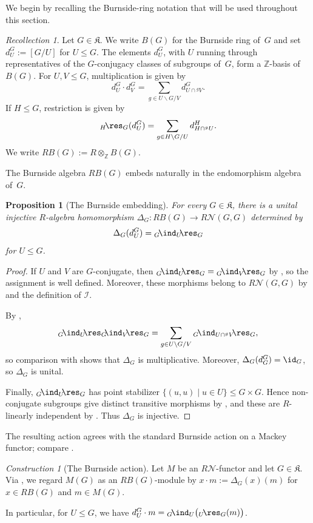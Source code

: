 \documentclass{amsart}
\numberwithin{equation}{section}%
\newtheorem{Prop}[equation]{Proposition}
\theoremstyle{remark}
\newtheorem{Cons}[equation]{Construction}
\newtheorem{Rec}[equation]{Recollection}
\theoremstyle{definition}
\newcommand{\n}{\mathcal N}
\newcommand{\lind}[1]{{}_{#1}\!\ind}
\newcommand{\lres}[1]{{}_{#1}\!\res}
\newcommand{\ires}[2]{{}_{#1}\!\res_{#2}}
\begin{document}
We begin by recalling the Burnside-ring notation that will be used
throughout this section.
%
\begin{Rec}
\label{rec:Burnside-ring}
Let $G\in\mathfrak K$.  We write $B(G)$ for the Burnside ring of~$G$
and set $d_U^G:=[G/U]$ for $U\leq G$.
The elements $d_U^G$, with $U$ running through representatives of the
$G$-conjugacy classes of subgroups of~$G$, form a $\mathbb Z$-basis
of~$B(G)$.  For $U,V\leq G$, multiplication is given by
%
\[
d_U^G\cdot d_V^G
=
\sum_{g\in U\backslash G/V}
d_{U\cap{}^gV}^{G}.
\]
%
If $H\leq G$, restriction is given by
%
\[
{}\ires{H}{G}(d_U^G)
=
\sum_{g\in H\backslash G/U}
d_{H\cap{}^gU}^{H}.
\]
%
We write $RB(G):=R\otimes_{\mathbb Z}B(G)$.
\end{Rec}
%
The Burnside algebra $RB(G)$ embeds naturally in the
endomorphism algebra of~$G$.
%
\begin{Prop}[The Burnside embedding]
\label{prop:Burnside-embedding}
For every $G\in\mathfrak K$, there is a unital injective
$R$-algebra homomorphism
$\Delta_G\colon RB(G)\longrightarrow R\n(G,G)$
determined by 
%
\[
\Delta_G(d_U^G)={}\lind{G}_U\!\lres{}_G
\]
%
for $U\leq G$.
\end{Prop}
%
\begin{proof}
If $U$ and $V$ are $G$-conjugate, then
${}\lind{G}_U\!\lres{}_G={}\lind{G}_V\!\lres{}_G$
by , so the assignment is well defined.
Moreover, these morphisms belong to $R\n(G,G)$ by 
and the definition of $\mathcal I$.

By ,
%
\[
{}\lind{G}_U\!\lres{}_G\!\lind{}_V\!\lres{}_G
=
\sum_{g\in U\backslash G/V}
{}\lind{G}_{{U\cap{}^gV}}\!\lres{}_G,
\]
%
so comparison with  shows that
$\Delta_G$ is multiplicative. Moreover,
$\Delta_G(d_G^G)=\id_G$, so $\Delta_G$ is unital.

Finally, ${}\lind{G}_U\!\lres{}_G$ has point stabilizer
$\{(u,u)\mid u\in U\}\leq G\times G$.
Hence non-conjugate subgroups give distinct transitive morphisms by
, and these are $R$-linearly independent by
.
Thus $\Delta_G$ is injective.
\end{proof}
%
The resulting action agrees with the standard Burnside action on a
Mackey functor; compare \cite[Proposition~1.5(i)]{Boltje98a}.
%
\begin{Cons}[The Burnside action]
\label{con:Burnside-action}
Let $M$ be an $R\n$-functor and let $G\in\mathfrak K$.
Via , we regard $M(G)$ as an
$RB(G)$-module by $x\cdot m:=\Delta_G(x)(m)$ for
$x\in RB(G)$ and $m\in M(G)$.

In particular, for $U\leq G$, we have
$d_U^G\cdot m={}\lind{G}_U\bigl(\lres{U}_G(m)\bigr)$.
\end{Cons}
\end{document}
